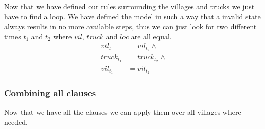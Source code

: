 \documentclass[12pt]{scrartcl}
\begin{document}
Now that we have defined our rules surrounding the villages and trucks we just have to find a loop. We have defined the model in such a way that a invalid state always results in no more available steps, thus we can just look for two different times $t_1$ and $t_2$ where $vil$, $truck$ and $loc$ are all equal.
\begin{align*}
    vil_{t_1} &= vil_{t_2} \wedge \\
    truck_{t_1} &= truck_{t_2} \wedge \\
    vil_{t_1} &= vil_{t_2}
\end{align*}

\subsubsection{Combining all clauses}
Now that we have all the clauses we can apply them over all villages where needed.
\end{document}
